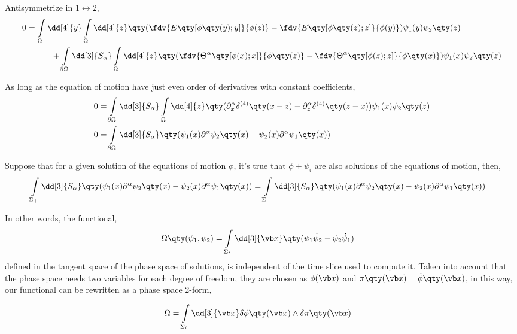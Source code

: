 Antisymmetrize in $1\leftrightarrow2$,
\begin{align}
    0&=\int\limits_{\Omega}\dd[4]{y}\int\limits_{\Omega}\dd[4]{z}\qty(\fdv{E\qty[\phi\qty(y);y]}{\phi(z)}-\fdv{E\qty[\phi\qty(z);z]}{\phi(y)})\psi_1(y)\psi_2\qty(z)\nonumber\\
    &\quad\quad\quad+\int\limits_{\partial\Omega}\dd[3]{S_{\alpha}}\int\limits_{\Omega}\dd[4]{z}\qty(\fdv{\Theta^\alpha\qty[\phi(x);x]}{\phi\qty(z)}-\fdv{\Theta^\alpha\qty[\phi(z);z]}{\phi\qty(x)})\psi_1(x)\psi_2\qty(z)
\end{align}

As long as the equation of motion have just even order of derivatives with constant coefficients,
\begin{align}
    0&=\int\limits_{\partial\Omega}\dd[3]{S_{\alpha}}\int\limits_{\Omega}\dd[4]{z}\qty(\partial^\alpha_x\delta^{(4)}\qty(x-z)-\partial^\alpha_z\delta^{(4)}\qty(z-x))\psi_1(x)\psi_2\qty(z)\\
    0&=\int\limits_{\partial\Omega}\dd[3]{S_{\alpha}}\qty(\psi_1(x)\partial^\alpha\psi_2\qty(x)-\psi_2(x)\partial^\alpha\psi_1\qty(x))
\end{align}

Suppose that for a given solution of the equations of motion $\phi$, it's true that $\phi+\psi_i$ are also solutions of the 
equations of motion, then,
\begin{align}
    \int\limits_{\Sigma_+}\dd[3]{S_{\alpha}}\qty(\psi_1(x)\partial^\alpha\psi_2\qty(x)-\psi_2(x)\partial^\alpha\psi_1\qty(x))&=\int\limits_{\Sigma_-}\dd[3]{S_{\alpha}}\qty(\psi_1(x)\partial^\alpha\psi_2\qty(x)-\psi_2(x)\partial^\alpha\psi_1\qty(x))
\end{align}

In other words, the functional,
\begin{align}
    \Omega\qty(\psi_1,\psi_2) &= \int\limits_{\Sigma_t}\dd[3]{\vb x}\qty(\psi_1\dot\psi_2-\psi_2\dot\psi_1)
\end{align}
defined in the tangent space of the phase space of solutions, is independent of the time slice used to compute it. Taken 
into account that the phase space needs two variables for each degree of freedom, they are chosen as $\phi(\vb x)$ and $\pi\qty(\vb x)=\dot\phi\qty(\vb x)$, 
in this way, our functional can be rewritten as a phase space 2-form,

\begin{align}
    \Omega &= \int\limits_{\Sigma_t}\dd[3]{\vb x}\delta\phi\qty(\vb x)\wedge\delta\pi\qty(\vb x)
\end{align}


